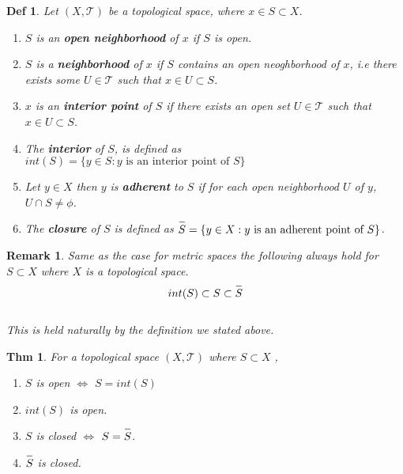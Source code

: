 \documentclass[paper=a4, fontsize=11pt]{scrartcl}
\newcommand{\T}{\mathcal{T}}
\newcommand{\overbar}[1]{
	\mkern 1.5mu \overline{\mkern-1.5mu\raisebox{0pt}[\dimexpr\height+0.5mm\relax]{$#1$}\mkern-1.5mu}\mkern 1.5mu
}
\newtheorem{theorem}{Thm}
\newtheorem{definition}{Def}
\newtheorem*{remark}{Remark}
\begin{document}
\begin{definition}
	Let $(X,\T)$ be a topological space, where $x\in S \subset X$.
	\begin{enumerate}[label=\arabic*)]
		\item $S$ is an \textbf{open neighborhood} of $x$ if $S$ is open.
		\item $S$ is a \textbf{neighborhood} of $x$ if $S$ contains an open neoghborhood of $x$, i.e there exists some $U \in \T$ such that $x \in U \subset S$.
		\item $x$ is an \textbf{interior point} of $S$ if there exists an open set $U \in \T$ such that $x\in U \subset S$.
		\item The \textbf{interior} of $S$, is defined as $int(S)=\{ y\in S : y \text{ is an interior point of } S \}$
		\item Let $y\in X$ then $y$ is \textbf{adherent} to $S$ if for each open neighborhood $U$ of $y$, $U\cap S \neq \phi$.
		\item The \textbf{closure} of $S$ is defined as $\overbar{S}=\{ y\in X : y \text{ is an adherent point of }S \}$.
	\end{enumerate}
\end{definition}

\vspace{0.15in}

\begin{remark}
	Same as the case for metric spaces the following always hold for $S\subset X$ where $X$ is a topological space. \\
	\begin{equation}\nonumber
		int(S) \subset S \subset \overbar{S}
	\end{equation}\\
	This is held naturally by the definition we stated above.
\end{remark}

\vspace{0.15in}

\begin{theorem}
	For a topological space $(X,\T)$ where $S \subset X$ , 
	\begin{enumerate}[label=\arabic*)]
		\item $S$ is open $\iff$ $S=int(S)$
		\item $int(S)$ is open.
		\item $S$ is closed $\iff$ $S=\overbar{S}$.
		\item $\overbar{S}$ is closed.\\
	\end{enumerate}
\end{theorem}
\end{document}
